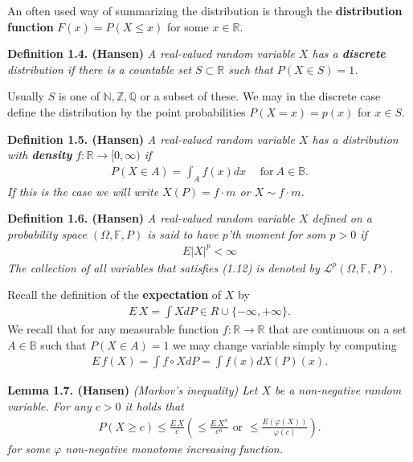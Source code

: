 \documentclass[a4paper,12pt,openany]{book}
\begin{document}
An often used way of summarizing the distribution is through the \textbf{distribution function} \(F(x)=P(X\le x)\) for some \(x\in\mathbb{R}\).

\textbf{Definition 1.4. (Hansen)} \emph{A real-valued random variable \(X\) has a \textbf{discrete} distribution if there is a countable set \(S\subset\mathbb{R}\) such that \(P(X\in S)=1\).}

Usually \(S\) is one of \(\mathbb{N},\mathbb{Z},\mathbb{Q}\) or a subset of these. We may in the discrete case define the distribution by the point probabilities \(P(X=x)=p(x)\) for \(x\in S\).

\textbf{Definition 1.5. (Hansen)} \emph{A real-valued random variable \(X\) has a distribution with \textbf{density} \(f : \mathbb{R}\to [0,\infty)\) if}
\begin{align*}
    P(X\in A)=\int_Af(x)dx\hspace{15pt}\text{for}\ A\in \mathbb{B}.\tag{1.5}
\end{align*}
\emph{If this is the case we will write \(X(P)=f\cdot m\) or \(X\sim f\cdot m\).}

\textbf{Definition 1.6. (Hansen)} \emph{A real-valued random variable \(X\) defined on a probability space \((\Omega, \mathbb{F},P)\) is said to have \(p\)'th moment for som \(p>0\) if}
\begin{align*}
    E\vert X\vert^p<\infty\tag{1.12}
\end{align*}
\emph{The collection of all variables that satisfies (1.12) is denoted by \(\mathcal{L}^p(\Omega,\mathbb{F},P)\).}

Recall the definition of the \textbf{expectation} of \(X\) by
\begin{align*}
    E\, X=\int XdP \in R\cup \{-\infty,+\infty\}.\tag{1.11}
\end{align*}
We recall that for any measurable function \(f : \mathbb{R}\to \mathbb{R}\) that are continuous on a set \(A\in\mathbb{B}\) such that \(P(X\in A)=1\) we may change variable simply by computing
\begin{align*}
    E\, f(X)=\int f\circ XdP=\int f(x)dX(P)(x).
\end{align*}

\textbf{Lemma 1.7. (Hansen)} \emph{(Markov's inequality) Let \(X\) be a non-negative random variable. For any \(c>0\) it holds that}
\begin{align*}
    P(X\ge c)\le \frac{E\, X}{c}\left(\le \frac{E\ X^n}{c^n}\text{ or }\le \frac{E\left(\varphi(X)\right)}{\varphi(c)}\right).\tag{1.14}
\end{align*}
\emph{for some \(\varphi\) non-negative monotome increasing function.}
\end{document}
